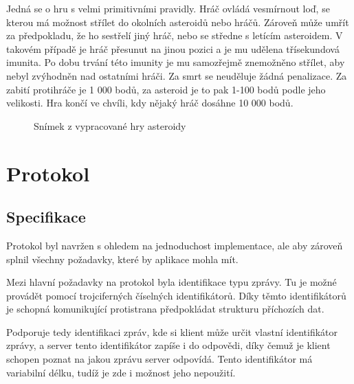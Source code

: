 \documentclass[12pt, a4paper]{article}
\begin{document}
    Jedná se o hru s velmi primitivními pravidly.
    Hráč ovládá vesmírnout loď, se kterou má možnost střílet do okolních asteroidů nebo hráčů.
    Zároveň může umřít za předpokladu, že ho sestřelí jiný hráč, nebo se středne s letícím asteroidem.
    V takovém případě je hráč přesunut na jinou pozici a je mu udělena třísekundová imunita.
    Po dobu trvání této imunity je mu samozřejmě znemožněno střílet, aby nebyl zvýhodněn nad ostatními hráči.
    Za smrt se neuděluje žádná penalizace.
    Za zabití protihráče je 1 000 bodů, za asteroid je to pak 1-100 bodů podle jeho velikosti.
    Hra končí ve chvíli, kdy nějaký hráč dosáhne 10 000 bodů.

    \begin{figure}[H]
        \caption{Snímek z vypracované hry asteroidy}
    \end{figure}

    \section{Protokol}
    \subsection{Specifikace}
    Protokol byl navržen s ohledem na jednoduchost implementace, ale aby zároveň splnil všechny požadavky, které by aplikace mohla mít.
    
    Mezi hlavní požadavky na protokol byla identifikace typu zprávy.
    Tu je možné provádět pomocí trojciferných číselných identifikátorů.
    Díky těmto identifikátorů je schopná komunikující protistrana předpokládat strukturu příchozích dat.

    Podporuje tedy identifikaci zpráv, kde si klient může určit vlastní identifikátor zprávy, a server tento identifikátor zapíše i do odpovědi, díky čemuž je klient schopen poznat na jakou zprávu server odpovídá.
    Tento identifikátor má variabilní délku, tudíž je zde i možnost jeho nepoužití.
\end{document}
